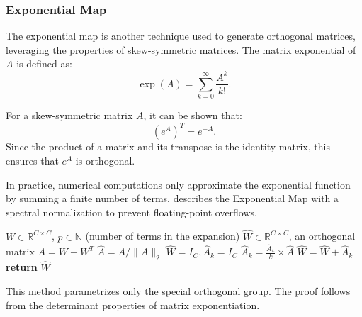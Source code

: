     \subsubsection{Exponential Map}
        
        The exponential map \cite{singla_skew_2021} is another technique used to generate orthogonal matrices, leveraging the properties of skew-symmetric matrices. The matrix exponential of $A$ is defined as:
        \begin{equation}
            \exp(A) = \sum_{k=0}^{\infty} \frac{A^k}{k!}.
        \end{equation}
        
        For a skew-symmetric matrix $A$, it can be shown that:
        \begin{equation}
            (e^A)^T = e^{-A}.
        \end{equation}
        Since the product of a matrix and its transpose is the identity matrix, this ensures that $e^A$ is orthogonal.
        
        In practice, numerical computations only approximate the exponential function by summing a finite number of terms. %
         describes the Exponential Map with a spectral normalization to prevent floating-point overflows.
        
        \begin{algorithm}   
        \begin{algorithmic}[1]
        \Require $W\in \mathbb{R}^{C\times C}$, $p \in \mathbb{N}$ (number of terms in the expansion)
        \Ensure $\hat{W}\in \mathbb{R}^{C\times C}$, an orthogonal matrix
        \State $A = W - W^{T}$
        \State $\hat{A} = A / \|A\|_2$ 
        \State $\hat{W} = I_{C}, \hat{A}_{k} = I_{C}$
            \State $\hat{A}_{k} = \frac{\hat{A}_{k}}{k} \times \hat{A}$
            \State $\hat{W} = \hat{W} + \hat{A}_{k}$
        \EndFor
        \State \textbf{return} $\hat{W}$
        \EndProcedure
        \end{algorithmic}
        \caption{Exponential Map Algorithm}   \label{alg:EXP}   
        \end{algorithm}
        
        This method parametrizes only the special orthogonal group. The proof follows from the determinant properties of matrix exponentiation.
        
